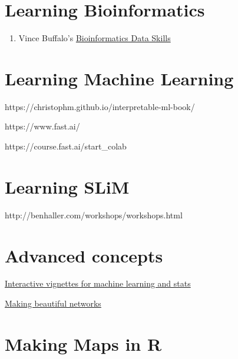 \documentclass[
  letterpaper,
  DIV=11,
  numbers=noendperiod]{scrreprt}
\providecommand{\tightlist}{%
  \setlength{\itemsep}{0pt}\setlength{\parskip}{0pt}}\usepackage{longtable,booktabs,array}
\begin{document}
\hypertarget{learning-bioinformatics}{%
\section*{\texorpdfstring{\textbf{Learning
Bioinformatics}}{Learning Bioinformatics}}\label{learning-bioinformatics}}

\begin{enumerate}
\def\labelenumi{\arabic{enumi}.}
\tightlist
\item
  Vince Buffalo's \href{https://vincebuffalo.com/book/}{Bioinformatics
  Data Skills}
\end{enumerate}

\hypertarget{learning-machine-learning}{%
\section*{\texorpdfstring{\textbf{Learning Machine
Learning}}{Learning Machine Learning}}\label{learning-machine-learning}}

https://christophm.github.io/interpretable-ml-book/

https://www.fast.ai/

https://course.fast.ai/start\_colab

\hypertarget{learning-slim}{%
\section*{\texorpdfstring{\textbf{Learning
SLiM}}{Learning SLiM}}\label{learning-slim}}

http://benhaller.com/workshops/workshops.html

\hypertarget{advanced-concepts}{%
\section*{\texorpdfstring{\textbf{Advanced
concepts}}{Advanced concepts}}\label{advanced-concepts}}

\href{https://distill.pub/}{Interactive vignettes for machine learning
and stats}

\href{https://gephi.org/}{Making beautiful networks}

\hypertarget{making-maps-in-r}{%
\section*{\texorpdfstring{\textbf{Making Maps in
R}}{Making Maps in R}}\label{making-maps-in-r}}
\end{document}
